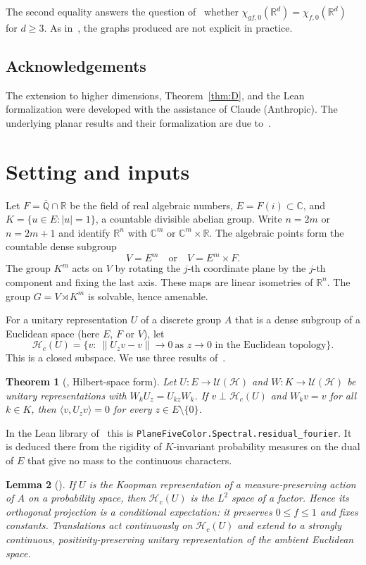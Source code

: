 \documentclass[11pt]{amsart}
\newtheorem{theorem}{Theorem}[section]
\newtheorem{lemma}[theorem]{Lemma}
\theoremstyle{definition}
\newcommand{\R}{\mathbb{R}}
\newcommand{\C}{\mathbb{C}}
\newcommand{\Q}{\mathbb{Q}}
\newcommand{\cH}{\mathcal{H}}
\begin{document}
The second equality answers the question of~\cite{MRVZ} whether $\chi_{gf,0}(\R^d)=\chi_{f,0}(\R^d)$ for $d\ge3$. As in~\cite{DV}, the graphs produced are not explicit in practice.

\subsection*{Acknowledgements}
The extension to higher dimensions, Theorem~\ref{thm:D}, and the Lean formalization were developed with the assistance of Claude (Anthropic). The underlying planar results and their formalization are due to~\cite{OAI}.

\section{Setting and inputs}\label{sec:setting}

Let $F=\overline{\Q}\cap\R$ be the field of real algebraic numbers, $E=F(i)\subset\C$, and $K=\{u\in E:|u|=1\}$, a countable divisible abelian group. Write $n=2m$ or $n=2m+1$ and identify $\R^n$ with $\C^m$ or $\C^m\times\R$. The algebraic points form the countable dense subgroup
\[
V=E^m\quad\text{or}\quad V=E^m\times F .
\]
The group $K^m$ acts on $V$ by rotating the $j$-th coordinate plane by the $j$-th component and fixing the last axis. These maps are linear isometries of $\R^n$. The group $G=V\rtimes K^m$ is solvable, hence amenable.

For a unitary representation $U$ of a discrete group $A$ that is a dense subgroup of a Euclidean space (here $E$, $F$ or $V$), let
\[
\cH_c(U)=\{v:\ \|U_zv-v\|\to0\ \text{as }z\to0\text{ in the Euclidean topology}\}.
\]
This is a closed subspace. We use three results of~\cite{OAI}.

\begin{theorem}[{\cite[Theorem 2.3]{OAI}}, Hilbert-space form]\label{thm:rigidity}
Let $U\colon E\to\mathcal U(\cH)$ and $W\colon K\to\mathcal U(\cH)$ be unitary representations with $W_kU_z=U_{kz}W_k$. If $v\perp\cH_c(U)$ and $W_kv=v$ for all $k\in K$, then $\langle v,U_zv\rangle=0$ for every $z\in E\setminus\{0\}$.
\end{theorem}

In the Lean library of~\cite{OAI} this is \texttt{PlaneFiveColor.Spectral.residual\_fourier}. It is deduced there from the rigidity of $K$-invariant probability measures on the dual of $E$ that give no mass to the continuous characters.

\begin{lemma}[{\cite[Lemma 4.1]{OAI}}]\label{lem:factor}
If $U$ is the Koopman representation of a measure-preserving action of $A$ on a probability space, then $\cH_c(U)$ is the $L^2$ space of a factor. Hence its orthogonal projection is a conditional expectation: it preserves $0\le f\le1$ and fixes constants. Translations act continuously on $\cH_c(U)$ and extend to a strongly continuous, positivity-preserving unitary representation of the ambient Euclidean space.
\end{lemma}
\end{document}
